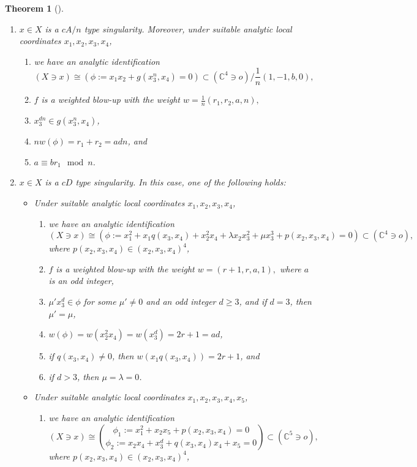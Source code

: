\documentclass[11pt]{amsart}
\numberwithin{equation}{section}
\newtheorem{thm}{Theorem}[section]
\theoremstyle{definition}
\theoremstyle{definition}
\begin{document}
\begin{thm}[{\cite[Theorem~1.2]{Kaw05}}]
\begin{enumerate}
    \item $x\in X$ is a $cA/n$ type singularity. Moreover, under suitable analytic local coordinates $x_1,x_2,x_3,x_4$,
    \begin{enumerate}
    \item we have an analytic identification
    $$(X\ni x)\cong (\phi:= x_1x_2+g(x_3^n,x_4)=0)\subset (\mathbb C^4\ni o)/\frac{1}{n}(1,-1,b,0),$$
    \item $f$ is a weighted blow-up with the weight $w=\frac{1}{n}(r_1,r_2,a,n),$
        \item $x_3^{dn}\in g(x_3^n,x_4)$,
        \item $nw(\phi)=r_1+r_2=adn$, and
        \item $a\equiv br_1\mod n$.
    \end{enumerate}
    \item $x\in X$ is a $cD$ type singularity. In this case, one of the following holds:
    \begin{itemize}
        \item[(2.1)] Under suitable analytic local coordinates $x_1,x_2,x_3,x_4$,
        \begin{enumerate}
        \item  we have an analytic identification $$(X\ni x)\cong (\phi:= x_1^2+x_1q(x_3,x_4)+x_2^2x_4+\lambda x_2x_3^2+\mu x_3^3+p(x_2,x_3,x_4)=0)\subset (\mathbb C^4\ni o),$$ where $p(x_2,x_3,x_4)\in(x_2,x_3,x_4)^4$,
            \item $f$ is a weighted blow-up with the weight $w=(r+1,r,a,1),$ where $a$ is an odd integer,
            \item $\mu' x_3^d\in \phi$ for some $\mu'\neq 0$ and an odd integer $d\geq 3$, and if $d=3$, then $\mu'=\mu$,
            \item $w(\phi)=w(x_2^2x_4)=w(x_3^d)=2r+1=ad$,
            \item if $q(x_3,x_4)\not=0$, then $w(x_1q(x_3,x_4))=2r+1$, and
            \item if $d>3$, then $\mu=\lambda=0$.
        \end{enumerate}
        \item[(2.2)] Under suitable analytic local coordinates $x_1,x_2,x_3,x_4,x_5$, 
        \begin{enumerate}
        \item  we have an analytic identification  $$(X\ni x)\cong \binom{\phi_1:= x_1^2+x_2x_5+p(x_2,x_3,x_4)=0}{\phi_2:= x_2x_4+x_3^d+q(x_3,x_4)x_4+x_5=0}\subset(\mathbb C^5\ni o),$$where $p(x_2,x_3,x_4)\in(x_2,x_3,x_4)^4$,

\end{enumerate}
\end{itemize}
\end{enumerate}
\end{thm}
\end{document}
